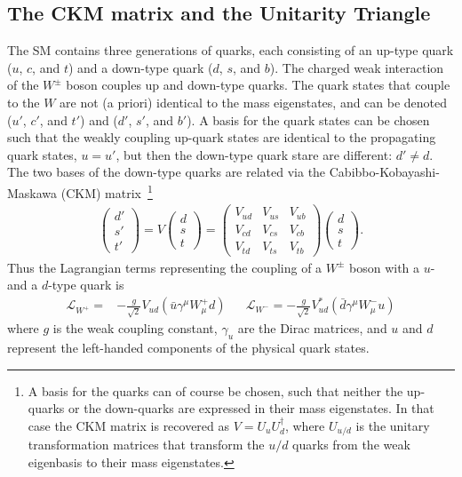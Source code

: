 \subsection{The CKM matrix and the Unitarity Triangle} %
\label{sub:the_ckm_matrix}

The SM contains three generations of quarks, each consisting of an up-type quark ($u$, $c$, and $t$) and a down-type quark ($d$, $s$, and $b$). The charged weak interaction of the $W^\pm$ boson couples up and down-type quarks. The quark states that couple to the $W$ are not (a priori) identical to the mass eigenstates, and can be denoted ($u'$, $c'$, and $t'$) and ($d'$, $s'$, and $b'$). A basis for the quark states can be chosen such that the weakly coupling up-quark states are identical to the propagating quark states, $u=u'$, but then the down-type quark stare are different: $d'\neq d$. The two bases of the down-type quarks are related via the Cabibbo-Kobayashi-Maskawa (CKM) matrix~\cite{kobayashiCPViolationRenormalizableTheory1973,cabibboUnitarySymmetryLeptonic1963}\footnote{
    A basis for the quarks can of course be chosen, such that neither the up-quarks or the down-quarks are expressed in their mass eigenstates. In that case the CKM matrix is recovered as $V=U_u U_d^\dagger$, where $U_{u/d}$ is the unitary transformation matrices that transform the $u/d$ quarks from the weak eigenbasis to their mass eigenstates.
}
\begin{align}
    \begin{pmatrix}
        d' \\ s' \\ t'
    \end{pmatrix}
    = V \begin{pmatrix}
            d \\ s \\ t
    \end{pmatrix} 
    =
    \begin{pmatrix}
        V_{ud} & V_{us} & V_{ub} \\
        V_{cd} & V_{cs} & V_{cb} \\
        V_{td} & V_{ts} & V_{tb} 
    \end{pmatrix}
    \begin{pmatrix}
            d \\ s \\ t
    \end{pmatrix}.
\end{align}
Thus the Lagrangian terms representing the coupling of a $W^\pm$ boson with a $u$- and a $d$-type quark is
\begin{align}\label{eq:W_coupling}
   \mathcal L_{W^+}= &-\frac{g}{\sqrt{2}}V_{ud} \left(\bar u \gamma^\mu W_\mu^+ d \right)&& \mathcal L_{W^-}=-\frac{g}{\sqrt{2}} V_{ud}^* \left( \bar d \gamma^\mu W_\mu^- u\right)
\end{align}
where $g$ is the weak coupling constant, $\gamma_u$ are the Dirac matrices, and $u$ and $d$ represent the left-handed components of the physical quark states.

